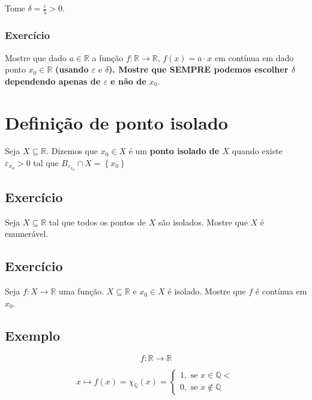 \documentclass[12pt]{article}
\begin{document}
    Tome $\delta = \frac{\varepsilon}{5} > 0$.

    \subsubsection*{Exercício}
    Mostre que dado $a \in \mathbb{R}$ a função $f: \mathbb{R} \to \mathbb{R}$, $f(x) = a \cdot x$ em contínua em dado ponto $x_0 \in \mathbb{R}$ \textbf{(usando $\varepsilon \text{ e } \delta$). Mostre que SEMPRE podemos escolher $\delta$ dependendo apenas de $\varepsilon$ e não de $x_0$}.

    \newpage
    \section*{Definição de ponto isolado}
    Seja $X \subseteq \mathbb{R}$. Dizemos que $x_0 \in X$ é um \textbf{ponto isolado de $X$} quando existe $\varepsilon_{x_0} > 0$ tal que $B_{\varepsilon_{x_0}} \cap X = \left\{x_0\right\}$

    \subsection*{Exercício}
    Seja $X \subseteq \mathbb{R}$ tal que todos os pontos de $X$ são isolados. Mostre que $X$ é enumerável.

    \subsection*{Exercício}
    Seja $f: X \to \mathbb{R}$ uma função. $X \subseteq \mathbb{R}$ e $x_0 \in X$ é isolado. Mostre que $f$ é contínua em $x_0$.

    \subsection{Exemplo}
    \begin{equation*}
        f: \mathbb{R} \to \mathbb{R}
    \end{equation*}

    \begin{equation*}
        x \longmapsto f(x) = \chi_{\mathbb{Q}}(x) = \left\{ 
        \begin{array}{l}
            1, \text{ se } x \in \mathbb{Q} < \\
            0, \text{ se } x \notin \mathbb{Q}
        \end{array}
        \right.
    \end{equation*}
\end{document}
